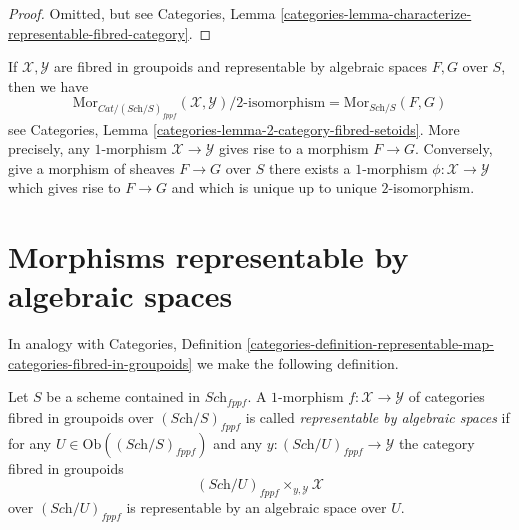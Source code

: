 \begin{proof}
Omitted, but see Categories,
Lemma \ref{categories-lemma-characterize-representable-fibred-category}.
\end{proof}

\noindent
If $\mathcal{X}, \mathcal{Y}$ are fibred in groupoids and
representable by algebraic spaces $F, G$ over $S$, then we have
\begin{equation}
\label{equation-morphisms-spaces}
\text{Mor}_{\textit{Cat}/(\textit{Sch}/S)_{fppf}}(\mathcal{X}, \mathcal{Y})
\Big/
2\text{-isomorphism}
=
\text{Mor}_{\textit{Sch}/S}(F, G)
\end{equation}
see
Categories, Lemma \ref{categories-lemma-2-category-fibred-setoids}.
More precisely, any $1$-morphism $\mathcal{X} \to \mathcal{Y}$
gives rise to a morphism $F \to G$. Conversely, give a morphism
of sheaves $F \to G$ over $S$ there exists a $1$-morphism
$\phi : \mathcal{X} \to \mathcal{Y}$ which gives rise to $F \to G$
and which is unique up to unique $2$-isomorphism.



\section{Morphisms representable by algebraic spaces}
\label{section-morphisms-representable-by-algebraic-spaces}

\noindent
In analogy with Categories, Definition
\ref{categories-definition-representable-map-categories-fibred-in-groupoids}
we make the following definition.

\begin{definition}
\label{definition-representable-by-algebraic-spaces}
Let $S$ be a scheme contained in $\textit{Sch}_{fppf}$.
A $1$-morphism $f : \mathcal{X} \to \mathcal{Y}$ of
categories fibred in groupoids over $(\textit{Sch}/S)_{fppf}$
is called {\it representable by algebraic spaces} if
for any $U \in \text{Ob}((\textit{Sch}/S)_{fppf})$
and any $y : (\textit{Sch}/U)_{fppf} \to \mathcal{Y}$
the category fibred in groupoids
$$
(\textit{Sch}/U)_{fppf} \times_{y, \mathcal{Y}} \mathcal{X}
$$
over $(\textit{Sch}/U)_{fppf}$
is representable by an algebraic space over $U$.
\end{definition}


